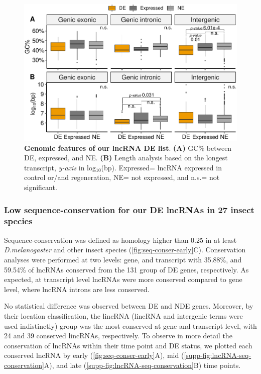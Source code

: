\begin{figure}[ht!]
  \centering
  \includegraphics[scale=0.6]{plots/results/dme/gc.length.pdf}
  \caption[Genomic features of our lncRNA DE list]{\textbf{Genomic features of our lncRNA DE list}. \textbf{(A)} GC\% between DE, expressed, and NE. \textbf{(B)} Length analysis based on the longest transcript, \textit{y-axis} in log$_{10}$(bp). Expressed= lncRNA expressed in control or/and regeneration, NE= not expressed, and n.s.= not significant.}
  \label{fig:genomic-cha}
\end{figure}

\subsubsection{Low sequence-conservation for our DE lncRNAs in 27 insect species}
\label{sec:sequence-conservation}

Sequence-conservation was defined as homology higher than 0.25 in at least \textit{D.melanogaster} and other insect species (\autoref{fig:seq-conser-early}C).  Conservation analyses were performed at two levels: gene, and transcript with 35.88\%, and 59.54\% of lncRNAs conserved from the 131 group of DE genes, respectively. As expected, at transcript level lncRNAs were more conserved compared to gene level, where lncRNA introns are less conserved.\autocite{lopez_2017,nitsche_2017,ulitsky_2016_evolution}

No statistical difference was observed between DE and NDE genes. Moreover, by their location classification, the lincRNA (lincRNA and intergenic terms were used indistinctly) group was the most conserved at gene and transcript level, with 24 and 39 conserved lincRNAs, respectively. To observe in more detail the conservation of lncRNAs within their time point and DE status, we plotted each conserved lncRNA by early (\autoref{fig:seq-conser-early}A), mid (\autoref{supp-fig:lncRNA-seq-conservation}A), and late (\autoref{supp-fig:lncRNA-seq-conservation}B) time points.

